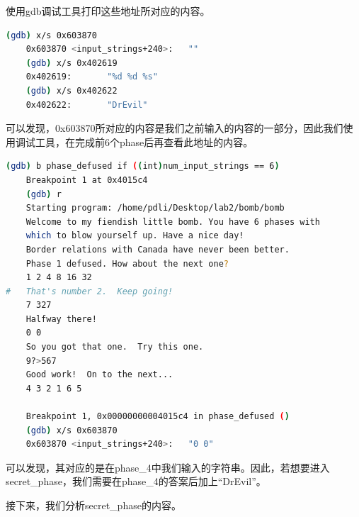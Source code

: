 \documentclass{article}
\begin{document}
使用gdb调试工具打印这些地址所对应的内容。

\begin{lstlisting}[language=bash]
    (gdb) x/s 0x603870
    0x603870 <input_strings+240>:   ""
    (gdb) x/s 0x402619
    0x402619:       "%d %d %s"
    (gdb) x/s 0x402622
    0x402622:       "DrEvil"
\end{lstlisting}

可以发现，0x603870所对应的内容是我们之前输入的内容的一部分，因此我们使用调试工具，在完成前6个phase后再查看此地址的内容。

\begin{lstlisting}[language=bash, commentstyle=\color{black}]
    (gdb) b phase_defused if ((int)num_input_strings == 6)
    Breakpoint 1 at 0x4015c4
    (gdb) r
    Starting program: /home/pdli/Desktop/lab2/bomb/bomb
    Welcome to my fiendish little bomb. You have 6 phases with
    which to blow yourself up. Have a nice day!
    Border relations with Canada have never been better.
    Phase 1 defused. How about the next one?
    1 2 4 8 16 32
#   That's number 2.  Keep going!
    7 327
    Halfway there!
    0 0
    So you got that one.  Try this one.
    9?>567
    Good work!  On to the next...
    4 3 2 1 6 5

    Breakpoint 1, 0x00000000004015c4 in phase_defused ()
    (gdb) x/s 0x603870
    0x603870 <input_strings+240>:   "0 0"
\end{lstlisting}

可以发现，其对应的是在phase\_4中我们输入的字符串。因此，若想要进入secret\_phase，我们需要在phase\_4的答案后加上“DrEvil”。

接下来，我们分析secret\_phase的内容。
\end{document}
